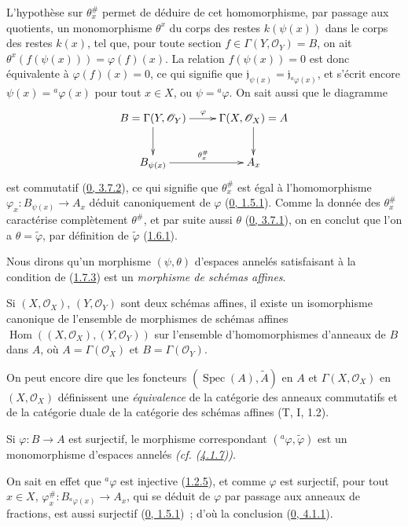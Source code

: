L'hypothèse sur $\theta_x^{\#}$ permet de déduire de cet homomorphisme, par
passage aux quotients, un monomorphisme $\theta^x$ du corps des restes
$k(\psi(x))$ dans le corps des restes $k(x)$, tel que, pour toute section
$f\in\Gamma(Y,\mathscr{O}_Y)=B$, on ait
$\theta^x(f(\psi(x)))=\varphi(f)(x)$. La relation $f(\psi(x))=0$ est donc
équivalente à $\varphi(f)(x)=0$, ce qui signifie que
$\mathfrak{j}_{\psi(x)}=\mathfrak{j}_{{}^a\varphi(x)}$, et s'écrit encore
$\psi(x)={}^a\varphi(x)$ pour tout $x\in X$, ou $\psi={}^a\varphi$. On sait
aussi que le diagramme
\label{I.1.7.3.diagram-fr}
\[
  \xymatrix{
    B=\Gamma(Y,\mathscr{O}_Y)\ar[r]^\varphi\ar[d] &
    \Gamma(X,\mathscr{O}_X)=A\ar[d]\\
    B_{\psi(x)}\ar[r]^{\theta_x^{\#}} & A_x
  }
\]
est commutatif (\hyperref[0.3.7.2-fr]{0, 3.7.2}), ce qui signifie que
$\theta_x^{\#}$ est égal à l'homomorphisme
$\varphi_x:B_{\psi(x)}\to A_x$ déduit canoniquement de $\varphi$
(\hyperref[0.1.5.1-fr]{0, 1.5.1}). Comme la donnée des $\theta_x^{\#}$
caractérise complètement $\theta^{\#}$, et par suite aussi $\theta$
(\hyperref[0.3.7.1-fr]{0, 3.7.1}), on en conclut que l'on a
$\theta=\widetilde\varphi$, par définition de $\widetilde\varphi$
(\hyperref[I.1.6.1-fr]{1.6.1}).

Nous dirons qu'un morphisme $(\psi,\theta)$ d'espaces annelés satisfaisant à
la condition de (\hyperref[I.1.7.3-fr]{1.7.3}) est un \emph{morphisme de
schémas affines}.

\begin{corollary}[1.7.4]
\label{I.1.7.4-fr}
Si $(X,\mathscr{O}_X)$, $(Y,\mathscr{O}_Y)$ sont deux schémas affines, il
existe un isomorphisme canonique de l'ensemble de morphismes de schémas
affines
$\operatorname{Hom}((X,\mathscr{O}_X),(Y,\mathscr{O}_Y))$ sur l'ensemble
d'homomorphismes d'anneaux de $B$ dans $A$, où
$A=\Gamma(\mathscr{O}_X)$ et $B=\Gamma(\mathscr{O}_Y)$.
\end{corollary}

On peut encore dire que les foncteurs $(\operatorname{Spec}(A),\widetilde A)$
en $A$ et $\Gamma(X,\mathscr{O}_X)$ en $(X,\mathscr{O}_X)$ définissent une
\emph{équivalence} de la catégorie des anneaux commutatifs et de la catégorie
duale de la catégorie des schémas affines (T, I, 1.2).

\begin{corollary}[1.7.5]
\label{I.1.7.5-fr}
Si $\varphi:B\to A$ est surjectif, le morphisme correspondant
$({}^a\varphi,\widetilde\varphi)$ est un monomorphisme d'espaces annelés
\emph{(cf. (\hyperref[I.4.1.7-fr]{4.1.7}))}.
\end{corollary}

On sait en effet que ${}^a\varphi$ est injective
(\hyperref[I.1.2.5-fr]{1.2.5}), et comme $\varphi$ est surjectif, pour tout
$x\in X$, $\varphi_x^{\#}:B_{{}^a\varphi(x)}\to A_x$, qui se déduit de
$\varphi$ par passage aux anneaux de fractions, est aussi surjectif
(\hyperref[0.1.5.1-fr]{0, 1.5.1})~; d'où la conclusion
(\hyperref[0.4.1.1-fr]{0, 4.1.1}).
